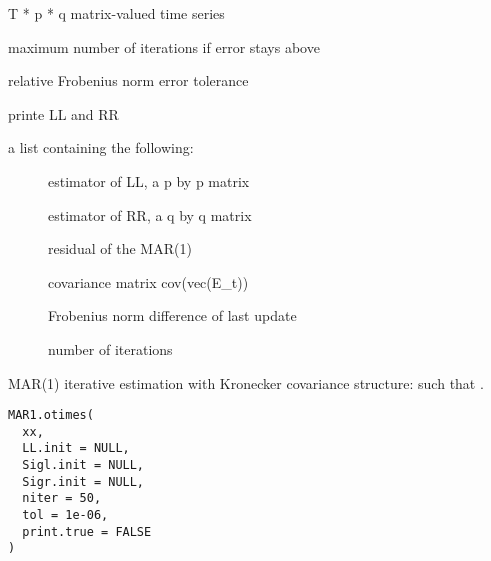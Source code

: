 \documentclass[a4paper]{book}
\begin{document}
%
\begin{Arguments}
\begin{ldescription}
\item[\code{xx}] T * p * q matrix-valued time series

\item[\code{niter}] maximum number of iterations if error stays above 

\item[\code{tol}] relative Frobenius norm error tolerance

\item[\code{print.true}] printe LL and RR
\end{ldescription}
\end{Arguments}
%
\begin{Value}
a list containing the following:\begin{description}

\item[] estimator of LL, a p by p matrix
\item[] estimator of RR, a q by q matrix
\item[] residual of the MAR(1)
\item[] covariance matrix cov(vec(E\_t))
\item[] Frobenius norm difference of last update
\item[] number of iterations

\end{description}

\end{Value}
%
\begin{Description}\relax
MAR(1) iterative estimation with Kronecker covariance structure:  such that .
\end{Description}
%
\begin{Usage}
\begin{verbatim}
MAR1.otimes(
  xx,
  LL.init = NULL,
  Sigl.init = NULL,
  Sigr.init = NULL,
  niter = 50,
  tol = 1e-06,
  print.true = FALSE
)
\end{verbatim}
\end{Usage}
%
\end{document}
